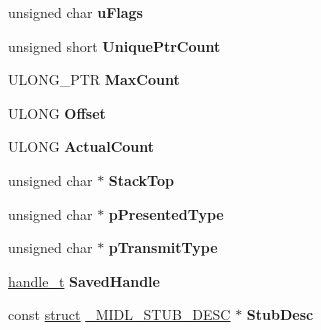 \begin{DoxyCompactItemize}
unsigned char {\bfseries u\+Flags}
\item 
\mbox{\label{struct___m_i_d_l___s_t_u_b___m_e_s_s_a_g_e_aef5afff0547293f348dc8c137f94e5f4}} 
unsigned short {\bfseries Unique\+Ptr\+Count}
\item 
\mbox{\label{struct___m_i_d_l___s_t_u_b___m_e_s_s_a_g_e_af99754ea3bd65ae703786e0ae5b1e712}} 
U\+L\+O\+N\+G\+\_\+\+P\+TR {\bfseries Max\+Count}
\item 
\mbox{\label{struct___m_i_d_l___s_t_u_b___m_e_s_s_a_g_e_a629b854be09e8b360da4c6e8d73480da}} 
U\+L\+O\+NG {\bfseries Offset}
\item 
\mbox{\label{struct___m_i_d_l___s_t_u_b___m_e_s_s_a_g_e_af97e8b9a5a7f05c8ee6940c644799217}} 
U\+L\+O\+NG {\bfseries Actual\+Count}
\item 
\mbox{\label{struct___m_i_d_l___s_t_u_b___m_e_s_s_a_g_e_a2a1dbe6ab28157e43dd4c69e33059d1c}} 
unsigned char $\ast$ {\bfseries Stack\+Top}
\item 
\mbox{\label{struct___m_i_d_l___s_t_u_b___m_e_s_s_a_g_e_a9b90f1e6546e438e994a9785b2acb1f8}} 
unsigned char $\ast$ {\bfseries p\+Presented\+Type}
\item 
\mbox{\label{struct___m_i_d_l___s_t_u_b___m_e_s_s_a_g_e_a8c7a7dc1c5d0d4cd1be712efdd51a0a8}} 
unsigned char $\ast$ {\bfseries p\+Transmit\+Type}
\item 
\mbox{\label{struct___m_i_d_l___s_t_u_b___m_e_s_s_a_g_e_a0747c85cbba801cab32de0f4bb5ebc9f}} 
\hyperlink{interfacevoid}{handle\+\_\+t} {\bfseries Saved\+Handle}
\item 
\mbox{\label{struct___m_i_d_l___s_t_u_b___m_e_s_s_a_g_e_acfdcae24c3ed6eec2cd92706123ffc62}} 
const \hyperlink{interfacestruct}{struct} \hyperlink{struct___m_i_d_l___s_t_u_b___d_e_s_c}{\+\_\+\+M\+I\+D\+L\+\_\+\+S\+T\+U\+B\+\_\+\+D\+E\+SC} $\ast$ {\bfseries Stub\+Desc}

\end{DoxyCompactItemize}
